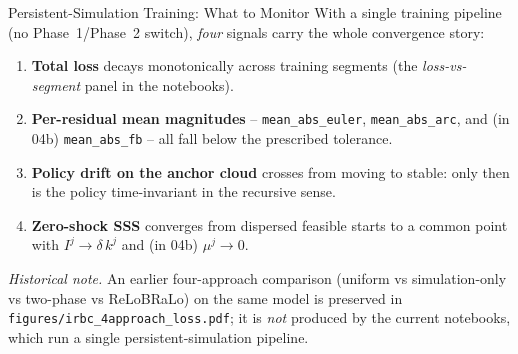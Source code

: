 \documentclass[aspectratio=169,11pt]{beamer}
\newcommand{\emphc}[1]{\textcolor{harvardcrimson}{#1}}
\begin{document}
\begin{frame}{Persistent-Simulation Training: What to Monitor}
With a single training pipeline (no Phase~1/Phase~2 switch), \emph{four} signals carry the whole convergence story:

\vspace{0.3em}
\begin{enumerate}\itemsep3pt
    \item \textbf{Total loss} decays monotonically across training segments (the \emph{loss-vs-segment} panel in the notebooks).
    \item \textbf{Per-residual mean magnitudes} -- \texttt{mean\_abs\_euler}, \texttt{mean\_abs\_arc}, and (in 04b) \texttt{mean\_abs\_fb} -- all fall below the prescribed tolerance.
    \item \textbf{Policy drift on the anchor cloud} crosses from \emphc{moving} to \emphc{stable}: only then is the policy time-invariant in the recursive sense.
    \item \textbf{Zero-shock SSS} converges from dispersed feasible starts to a common point with $I^j \to \delta\,k^j$ and (in 04b) $\mu^j \to 0$.
\end{enumerate}

\vspace{0.4em}
{\footnotesize \emph{Historical note.}  An earlier four-approach comparison (uniform vs simulation-only vs two-phase vs ReLoBRaLo) on the same model is preserved in \texttt{figures/irbc\_4approach\_loss.pdf}; it is \emph{not} produced by the current notebooks, which run a single persistent-simulation pipeline.}
\end{frame}
\end{document}

